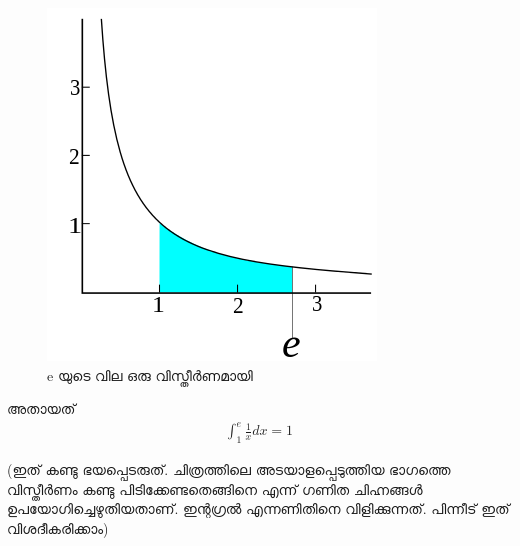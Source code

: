 \documentclass[10pt,a4paper]{report}
\begin{document}
    \begin{figure}[H]
  \center
\includegraphics[scale=.25]{images/e2}
\caption{e യുടെ  വില ഒരു വിസ്തീർണമായി  }
\label{e3}
\end{figure}
അതായത് 
\begin{align*}
\int_{1}^{e} \frac{1}{x} dx = 1
\end{align*}


(ഇത് കണ്ടു ഭയപ്പെടരുത്. ചിത്രത്തിലെ അടയാളപ്പെടുത്തിയ ഭാഗത്തെ വിസ്തീർണം   കണ്ടു പിടിക്കേണ്ടതെങ്ങിനെ എന്ന്  ഗണിത ചിഹ്നങ്ങൾ ഉപയോഗിച്ചെഴുതിയതാണ്. ഇന്റഗ്രൽ എന്നണിതിനെ വിളിക്കുന്നത്. പിന്നീട് ഇത് വിശദീകരിക്കാം) 
\end{document}
